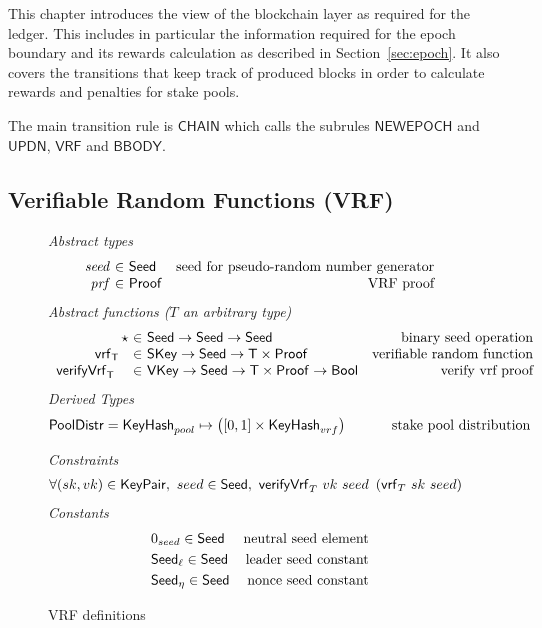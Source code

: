 This chapter introduces the view of the blockchain layer as required for the
ledger. This includes in particular the information required for the epoch
boundary and its rewards calculation as described in Section~\ref{sec:epoch}. It
also covers the transitions that keep track of produced blocks in order to
calculate rewards and penalties for stake pools.

The main transition rule is $\mathsf{CHAIN}$ which calls the subrules
$\mathsf{NEWEPOCH}$ and $\mathsf{UPDN}$, $\mathsf{VRF}$ and $\mathsf{BBODY}$.

\subsection{Verifiable Random Functions (VRF)}
\label{sec:defs-vrf}

\begin{figure}[htb]
  \emph{Abstract types}
  \begin{equation*}
    \begin{array}{r@{~\in~}lr}
      \var{seed} & \Seed  & \text{seed for pseudo-random number generator}\\
      \var{prf} & \Proof  & \text{VRF proof}\\
    \end{array}
  \end{equation*}
  \emph{Abstract functions ($T$ an arbitrary type)}
  \begin{equation*}
    \begin{array}{r@{~\in~}lr}
      \seedOp & \Seed \to \Seed \to \Seed & \text{binary seed operation} \\
      \vrf{\T}{}{} & \SKey \to \Seed \to \T\times\Proof
                   & \text{verifiable random function} \\
      \verifyVrf{\T}{}{}{} & \VKey \to \Seed \to \T\times\Proof \to \Bool
                           & \text{verify vrf proof} \\
    \end{array}
  \end{equation*}
  \emph{Derived Types}
  \begin{align*}
    \mathsf{PoolDistr} = \mathsf{KeyHash}_{pool} \mapsto \left([0, 1]\times\mathsf{KeyHash}_{vrf}\right)
      \text{ \hspace{1cm}stake pool distribution}
  \end{align*}

  \emph{Constraints}
  \begin{align*}
    & \forall (sk, vk) \in \mathsf{KeyPair},~ seed \in \mathsf{Seed},~
    \mathsf{verifyVrf}_{T} ~ vk ~ seed ~\left(\mathsf{vrf}_{T} ~ sk ~ seed\right)
  \end{align*}
  \emph{Constants}
  \begin{align*}
    & 0_{seed} \in \mathsf{Seed} & \text{neutral seed element} \\
    & \mathsf{Seed}_\ell \in \mathsf{Seed} & \text{leader seed constant} \\
    & \mathsf{Seed}_\eta \in \mathsf{Seed} & \text{nonce seed constant}\\
  \end{align*}

  \caption{VRF definitions}
  \label{fig:defs-vrf}
\end{figure}

